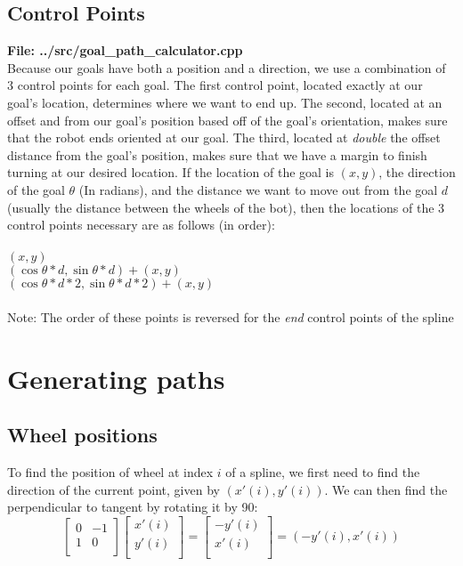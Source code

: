 \documentclass[12pt, english]{article}
\begin{document}
\subsection{Control Points}
\textbf{File: ../src/goal\_path\_calculator.cpp} \\
Because our goals have both a position and a direction, we use a combination of 3 control points for each goal. The first control point, located exactly at our goal's location, determines where we want to end up. The second, located at an offset and from our goal's position based off of the goal's orientation, makes sure that the robot ends oriented at our goal. The third, located at \textit{double} the offset distance from the goal's position, makes sure that we have a margin to finish turning at our desired location. If the location of the goal is $(x, y)$, the direction of the goal $\theta$ (In radians), and the distance we want to move out from the goal $d$ (usually the distance between the wheels of the bot), then the locations of the 3 control points necessary are as follows (in order): \\
\\
$(x, y)$ \\
$(\cos{\theta} * d, \sin{\theta} * d) + (x, y)$ \\
$(\cos{\theta} * d * 2, \sin{\theta} * d * 2) + (x, y)$ \\
\\
Note: The order of these points is reversed for the \textit{end} control points of the spline

\section{Generating paths}
\subsection{Wheel positions}
To find the position of wheel at index $i$ of a spline, we first need to find the direction of the current point, given by $(x'(i), y'(i))$. We can then find the perpendicular to tangent by rotating it by 90\degree: \\

\begin{equation}
	\begin{bmatrix}
		0 & -1 \\
		1 & 0 \\
	\end{bmatrix}
	\begin{bmatrix}
		x'(i)\\
		y'(i)\\
	\end{bmatrix}
	=
	\begin{bmatrix}
		-y'(i)\\
		x'(i)\\
	\end{bmatrix}
	= (-y'(i), x'(i)) 
\end{equation}
\end{document}
